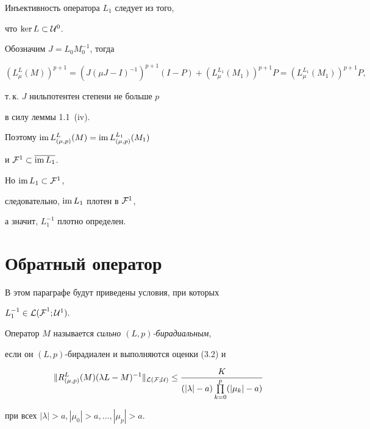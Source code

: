 \begin{pf}


Инъективность оператора $L_1$ следует из того,


что $\ker L\subset {\cal U}^0$.


Обозначим $J=L_0M_0^{-1}$, тогда


$$


(L_{\mu }^L(M))^{p+1}=(J(\mu J-I)^{-1})^{p+1}(I-P)+


(L_{\mu }^{L_1}(M_1))^{p+1}P=


(L_{\mu }^{L_1}(M_1))^{p+1}P,


$$


т.\,к. $J$ нильпотентен степени не больше $p$


в силу леммы 1.1~(iv).


Поэтому $\operatorname{im} L_{(\mu ,p)}^L(M)=\operatorname{im} L_{(\mu ,p)}^{L_1}(M_1)$


и ${\cal F}^1\subset\overline{\operatorname{im} L_1}$.


Но $\operatorname{im} L_1\subset {\cal F}^1$,


следовательно, $\operatorname{im} L_1$ плотен в ${\cal F}^1$,


а значит, $L_1^{-1}$ плотно определен.


\end{pf}





\section{Обратный оператор}





В этом параграфе будут приведены условия, при которых


$L^{-1}_1\in {\cal L(F}^1;{\cal U}^1{\cal )}.$





\begin{defns}


Оператор $M$ называется {\it сильно $(L,p)$-бирадиальным},


если он $(L,p)$-бирадиален  и выполняются оценки (3.2) и


\begin{equation}


\| R^L_{(\mu ,p)}(M)(\lambda L-M)^{-1}


\|_{\cal L(\cal F;\cal U)} \le \frac{K}{(|\lambda |-a)


\prod\limits^p_{k=0} (|\mu_k |-a)}


\end{equation}


при всех $|\lambda |>a,|\mu_0|>a ,\dotsc,|\mu_p|>a$.


\end{defns}





